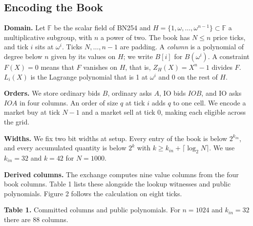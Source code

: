 \subsection{Encoding the Book}

\textbf{Domain.} Let \(\mathbb{F}\) be the scalar field of BN254 and \(H = \{1, \omega, \ldots, \omega^{n-1}\} \subset \mathbb{F}\) a multiplicative subgroup, with \(n\) a power of two. The book has \(N \le n\) price ticks, and tick \(i\) sits at \(\omega^i\). Ticks \(N, \ldots, n-1\) are padding. A \emph{column} is a polynomial of degree below \(n\) given by its values on \(H\); we write \(B[i]\) for \(B(\omega^i)\). A constraint \(F(X) = 0\) means that \(F\) vanishes on \(H\), that is, \(Z_H(X) = X^n - 1\) divides \(F\). \(L_i(X)\) is the Lagrange polynomial that is 1 at \(\omega^i\) and 0 on the rest of \(H\).

\textbf{Orders.} We store ordinary bids \(B\), ordinary asks \(A\), IO bids \(IOB\), and IO asks \(IOA\) in four columns. An order of size \(q\) at tick \(i\) adds \(q\) to one cell. We encode a market buy at tick \(N-1\) and a market sell at tick 0, making each eligible across the grid.

\textbf{Widths.} We fix two bit widths at setup. Every entry of the book is below \(2^{k_{in}}\), and every accumulated quantity is below \(2^k\) with \(k \ge k_{in} + \lceil \log_2 N \rceil\). We use \(k_{in} = 32\) and \(k = 42\) for \(N = 1000\).

\textbf{Derived columns.} The exchange computes nine value columns from the four book columns. Table 1 lists these alongside the lookup witnesses and public polynomials. Figure 2 follows the calculation on eight ticks.

\textbf{Table 1.} Committed columns and public polynomials. For \(n = 1024\) and \(k_{in} = 32\) there are 88 columns.


